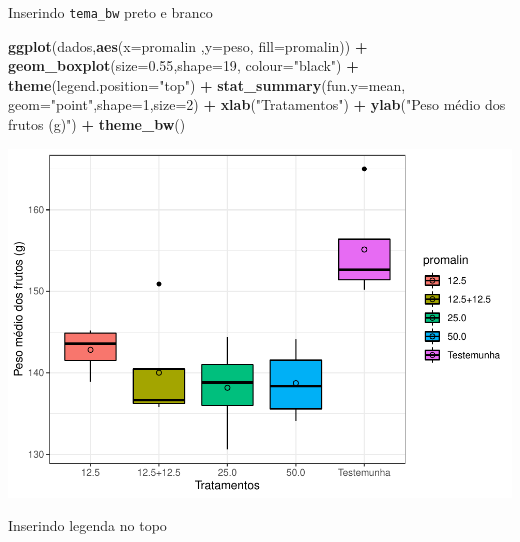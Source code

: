 \documentclass[]{book}
\newenvironment{Shaded}{\begin{snugshade}}{\end{snugshade}}
\newcommand{\DataTypeTok}[1]{\textcolor[rgb]{0.13,0.29,0.53}{#1}}
\newcommand{\DecValTok}[1]{\textcolor[rgb]{0.00,0.00,0.81}{#1}}
\newcommand{\FloatTok}[1]{\textcolor[rgb]{0.00,0.00,0.81}{#1}}
\newcommand{\KeywordTok}[1]{\textcolor[rgb]{0.13,0.29,0.53}{\textbf{#1}}}
\newcommand{\NormalTok}[1]{#1}
\newcommand{\OperatorTok}[1]{\textcolor[rgb]{0.81,0.36,0.00}{\textbf{#1}}}
\newcommand{\StringTok}[1]{\textcolor[rgb]{0.31,0.60,0.02}{#1}}
\begin{document}
Inserindo \texttt{tema\_bw} preto e branco

\begin{Shaded}
\begin{Highlighting}[]
\KeywordTok{ggplot}\NormalTok{(dados,}\KeywordTok{aes}\NormalTok{(}\DataTypeTok{x=}\NormalTok{promalin ,}\DataTypeTok{y=}\NormalTok{peso, }\DataTypeTok{fill=}\NormalTok{promalin)) }\OperatorTok{+}\StringTok{ }
\StringTok{      }\KeywordTok{geom_boxplot}\NormalTok{(}\DataTypeTok{size=}\FloatTok{0.55}\NormalTok{,}\DataTypeTok{shape=}\DecValTok{19}\NormalTok{, }\DataTypeTok{colour=}\StringTok{"black"}\NormalTok{) }\OperatorTok{+}\StringTok{ }
\StringTok{      }\KeywordTok{theme}\NormalTok{(}\DataTypeTok{legend.position=}\StringTok{"top"}\NormalTok{) }\OperatorTok{+}\StringTok{ }
\StringTok{      }\KeywordTok{stat_summary}\NormalTok{(}\DataTypeTok{fun.y=}\NormalTok{mean, }\DataTypeTok{geom=}\StringTok{"point"}\NormalTok{,}\DataTypeTok{shape=}\DecValTok{1}\NormalTok{,}\DataTypeTok{size=}\DecValTok{2}\NormalTok{) }\OperatorTok{+}\StringTok{ }
\StringTok{      }\KeywordTok{xlab}\NormalTok{(}\StringTok{"Tratamentos"}\NormalTok{) }\OperatorTok{+}\StringTok{  }
\StringTok{      }\KeywordTok{ylab}\NormalTok{(}\StringTok{"Peso médio dos frutos (g)"}\NormalTok{)  }\OperatorTok{+}
\StringTok{      }\KeywordTok{theme_bw}\NormalTok{() }
\end{Highlighting}
\end{Shaded}

\includegraphics{TudodoR_files/figure-latex/unnamed-chunk-237-1.pdf}

Inserindo legenda no topo
\end{document}
